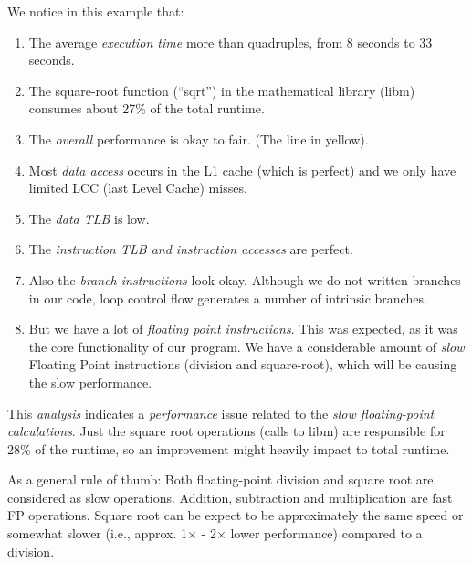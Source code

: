 We notice in this example that:
\begin{enumerate}
  \item  The average \emph{execution time} more than quadruples, from 8 seconds to 33 seconds.
  \item  The square-root function (``sqrt'') in the mathematical library (libm) consumes about 27\% of the total runtime.
  \item  The \emph{overall} performance is okay to fair. (The line in yellow).
  \item  Most \emph{data access} occurs in the L1 cache (which is perfect) and we only have limited LCC (last Level Cache) misses.
  \item  The \emph{data TLB} is low.
  \item  The \emph{instruction TLB and instruction accesses} are perfect.
  \item  Also the \emph{branch instructions} look okay. Although we do not written branches in our code, loop control flow generates a number of intrinsic branches.
  \item  But we have a lot of \emph{floating point instructions}. This was expected, as it was the core functionality of our program. We have a considerable amount of \emph{slow} Floating Point instructions (division and square-root), which will be causing the slow performance.
\end{enumerate}

This \emph{analysis} indicates a \emph{performance} issue related to the \emph{slow floating-point calculations}. Just the square root operations (calls to libm) are responsible for 28\% of the runtime, so an improvement might heavily impact to total runtime.

As a general rule of thumb: Both floating-point division and square root are considered as slow operations. Addition, subtraction and multiplication are fast FP operations. Square root can be expect to be approximately the same speed or somewhat slower (i.e., approx. 1$\times$ - 2$\times$ lower performance) compared to a division.


